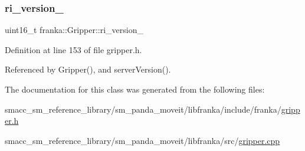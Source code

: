 \subsubsection{\texorpdfstring{ri\+\_\+version\+\_\+}{ri\_version\_}}
{\footnotesize\ttfamily uint16\+\_\+t franka\+::\+Gripper\+::ri\+\_\+version\+\_\+\hspace{0.3cm}{\ttfamily [private]}}



Definition at line 153 of file gripper.\+h.



Referenced by Gripper(), and server\+Version().



The documentation for this class was generated from the following files\+:\begin{DoxyCompactItemize}
\item 
smacc\+\_\+sm\+\_\+reference\+\_\+library/sm\+\_\+panda\+\_\+moveit/libfranka/include/franka/\hyperlink{gripper_8h}{gripper.\+h}\item 
smacc\+\_\+sm\+\_\+reference\+\_\+library/sm\+\_\+panda\+\_\+moveit/libfranka/src/\hyperlink{gripper_8cpp}{gripper.\+cpp}\end{DoxyCompactItemize}
